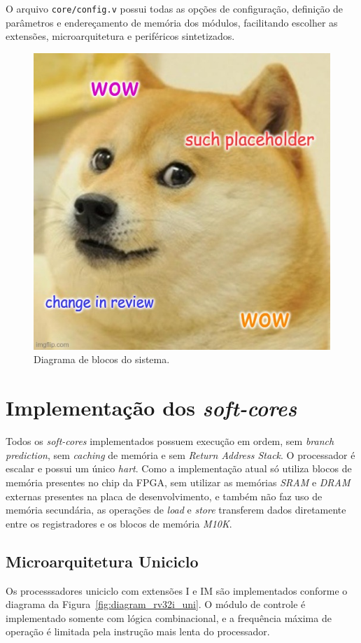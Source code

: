 {
    O arquivo \texttt{core/config.v} possui todas as opções de configuração,
    definição de parâmetros e endereçamento de memória dos módulos, facilitando
    escolher as extensões, microarquitetura e periféricos sintetizados.
}


\begin{figure}[H]
\centering
    \includegraphics[width=0.6\linewidth]{../images/placeholder.jpg}
    \caption{Diagrama de blocos do sistema.}\label{fig:diagram_fpga_blocks}
\end{figure}


\section{Implementação dos \textit{soft-cores}}
    { Todos os \textit{soft-cores} implementados possuem execução em ordem, sem
        \textit{branch prediction}, sem \textit{caching} de memória e sem
        \textit{Return Address Stack}. O processador é escalar e possui um
        único \textit{hart}. Como a implementação atual só utiliza blocos de
        memória presentes no chip da FPGA, sem utilizar as memórias
        \textit{SRAM} e \textit{DRAM} externas presentes na placa de
        desenvolvimento, e também não faz uso de memória secundária, as operações
        de \textit{load} e \textit{store} transferem dados diretamente entre os
        registradores e os blocos de memória \textit{M10K}.
    }

    \subsection{Microarquitetura Uniciclo}

        { Os processsadores uniciclo com extensões I e IM são implementados
            conforme o diagrama da Figura~\ref{fig:diagram_rv32i_uni}. O módulo
            de controle é implementado somente com lógica combinacional, e a
            frequência máxima de operação é limitada pela instrução mais lenta
            do processador.
        }

